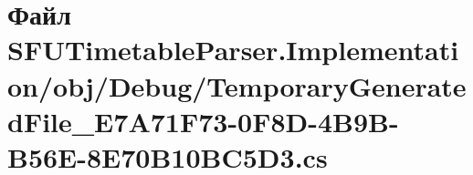 \hypertarget{_s_f_u_timetable_parser_8_implementation_2obj_2_debug_2_temporary_generated_file___e7_a71_f73-0_2f7efe9b6cc46292aafac5bff7184e56}{}\section{Файл S\+F\+U\+Timetable\+Parser.\+Implementation/obj/\+Debug/\+Temporary\+Generated\+File\+\_\+\+E7\+A71\+F73-\/0\+F8\+D-\/4\+B9\+B-\/\+B56\+E-\/8\+E70\+B10\+B\+C5\+D3.cs}
\label{_s_f_u_timetable_parser_8_implementation_2obj_2_debug_2_temporary_generated_file___e7_a71_f73-0_2f7efe9b6cc46292aafac5bff7184e56}
